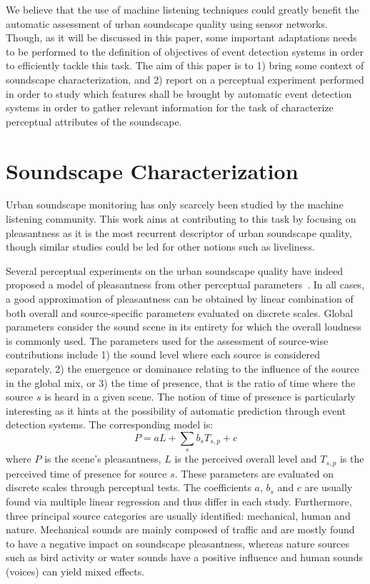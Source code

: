 \documentclass{article}
\begin{document}
\begin{sloppy}
We believe that the use of machine listening techniques could greatly benefit the automatic assessment of urban soundscape quality using sensor networks. Though, as it will be discussed in this paper, some important adaptations needs to be performed to the definition of objectives of event detection systems in order to efficiently tackle this task. The aim of this paper is to 1) bring some context of soundscape characterization, and 2) report on a perceptual experiment performed in order to study which features shall be brought by automatic event detection systems in order to gather relevant information for the task of characterize perceptual attributes of the soundscape.


\section{Soundscape Characterization}
\label{sec:char}

Urban soundscape monitoring has only scarcely been studied by the machine listening community\cite{bello2018}. This work aims at contributing to this task by focusing on pleasantness as it is the most recurrent descriptor of urban soundscape quality, though similar studies could be led for other notions such as liveliness.

Several perceptual experiments on the urban soundscape quality have indeed proposed a model of pleasantness from other perceptual parameters~\cite{nilsson2007, axelsson2010, aumond2017, ricciardi2014}. In all cases, a good approximation of pleasantness can be obtained by linear combination of both overall and source-specific parameters evaluated on discrete scales. Global parameters consider the sound scene in its entirety for which the overall loudness is commonly used. The parameters used for the assessment of source-wise contributions include 1) the sound level where each source is considered separately, 2) the emergence or dominance relating to the influence of the source in the global mix, or 3) the time of presence, that is the ratio of time where the source $s$ is heard in a given scene. The notion of time of presence is particularly interesting as it hints at the possibility of automatic prediction through event detection systems. The corresponding model is:
\begin{equation}
P = aL + \sum_s b_sT_{s,p} + c
\end{equation}
where $P$ is the scene's pleasantness, $L$ is the perceived overall level and $T_{s,p}$ is the perceived time of presence for source $s$. These parameters are evaluated on discrete scales through perceptual tests. The coefficients $a$, $b_s$ and $c$ are usually found via multiple linear regression and thus differ in each study.
Furthermore, three principal source categories are usually identified: mechanical, human and nature. Mechanical sounds are mainly composed of traffic and are mostly found to have a negative impact on soundscape pleasantness, whereas nature sources such as bird activity or water sounds have a positive influence and human sounds (voices) can yield mixed effects.


\end{sloppy}
\end{document}
